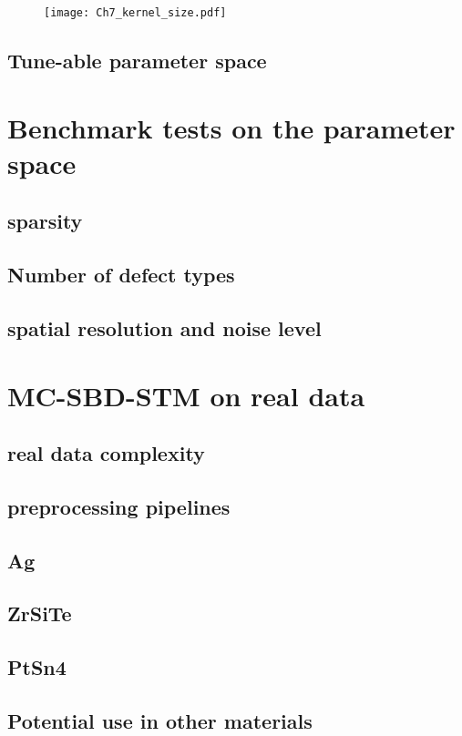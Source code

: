 \begin{figure}
	\texttt{[image: Ch7\_kernel\_size.pdf]} 
	\centering
	\caption{}
	\label{fig:ch7_kernel_size}
\end{figure}

\subsection{Tune-able parameter space}

\section{Benchmark tests on the parameter space}
\subsection{sparsity}
\subsection{Number of defect types}
\subsection{spatial resolution and noise level}

\section{MC-SBD-STM on real data}
\subsection{real data complexity}
\subsection{preprocessing pipelines}
\subsection{Ag}
\subsection{ZrSiTe}
\subsection{PtSn4}
\subsection{Potential use in other materials}

